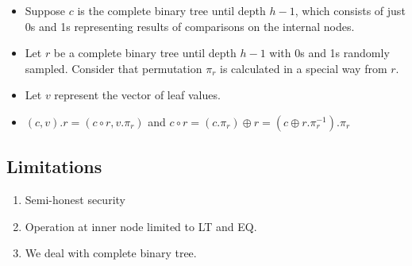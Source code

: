 \begin{enumerate}
\begin{itemize}
        \item Suppose $c$ is the complete binary tree until depth $h-1$, which consists of just 0s and 1s representing results of comparisons on the internal nodes.
        \item Let $r$ be a complete binary tree until depth $h-1$ with 0s and 1s randomly sampled. Consider that permutation $\pi_r$ is calculated in a special way from $r$.
        \item Let $v$ represent the vector of leaf values.
        \item $(c, v).r = (c \circ r, v . \pi_r)$ and $c \circ r = (c . \pi_r) \oplus r = (c \oplus r.\pi_r^{-1}).\pi_r$ 
    \end{itemize}
\end{enumerate}

%

\subsection{Limitations}
\begin{enumerate}
    \item Semi-honest security
    \item Operation at inner node limited to LT and EQ.
    \item We deal with complete binary tree.
\end{enumerate}




%
